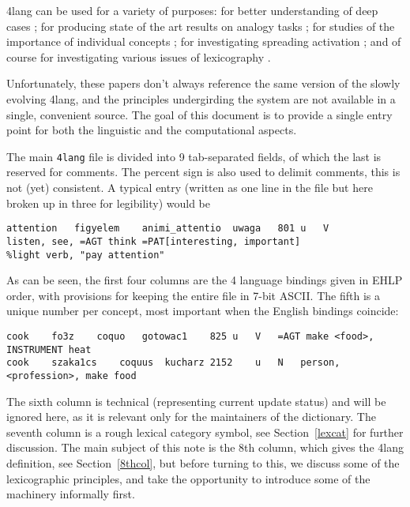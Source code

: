 \documentclass[11pt,bookmarks,bookmarksnumbered,naturalnames,plainpages=false,pdftex,colorlinks=true,urlcolor=blue,bookmarksdepth=subsection,plainpages=false]{paper}
\begin{document}
4lang can be used for a variety of purposes: for better understanding of
deep cases \citep{Makrai:2014}; for producing state of the art results on
analogy tasks \citep{Recski:2016c}; for studies of the importance of
individual concepts \citep{Makrai:2013a}; for investigating spreading
activation \citep{Nemeskey:2013}; and of course for investigating various
issues of lexicography \citep{Kornai:2015a}.

Unfortunately, these papers don't always reference the same version of the
slowly evolving 4lang, and the principles undergirding the system are not
available in a single, convenient source. The goal of this document is to
provide a single entry point for both the linguistic and the computational
aspects. 

The main {\tt 4lang} file is divided into 9 tab-separated fields, of which the
last is reserved for comments. The percent sign is also used to delimit
comments, this is not (yet) consistent. A typical entry (written as one line
in the file but here broken up in three for legibility) would be

\begin{verbatim}
attention	figyelem	animi_attentio	uwaga	801	u	V    
listen, see, =AGT think =PAT[interesting, important] 
%light verb, "pay attention"
\end{verbatim}

\noindent
As can be seen, the first four columns are the 4 language bindings given in
EHLP order, with provisions for keeping the entire file in 7-bit ASCII. The
fifth is a unique number per concept, most important when the English bindings
coincide: 

\begin{verbatim}
cook	fo3z	coquo	gotowac1	825	u	V	=AGT make <food>, INSTRUMENT heat	
cook	szaka1cs	coquus	kucharz	2152	u	N	person, <profession>, make food		
\end{verbatim}

\noindent
The sixth column is technical (representing current update status) and will be
ignored here, as it is relevant only for the maintainers of the
dictionary. The seventh column is a rough lexical category symbol, see
Section~\ref{lexcat} for further discussion. The main subject of this note is
the 8th column, which gives the 4lang definition, see Section~\ref{8thcol}, 
but before turning to this, we discuss some of the lexicographic principles,
and take the opportunity to introduce some of the machinery informally first. 

\end{document}
